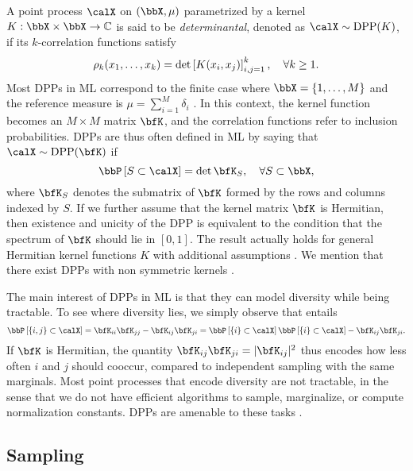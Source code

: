 \documentclass[twoside,11pt]{article}
\begin{document}
    A point process $\calX$ on $(\bbX,\mu)$ parametrized by a kernel $K:\bbX\times \bbX\rightarrow \mathbb{C}$ is said to be \emph{determinantal}, denoted as $\calX\sim\DPP(K)$, if its $k$-correlation functions satisfy
	  \begin{equation*}
	  \label{eq:k-correlation_function_DPP}
	    \rho_k(x_1,\dots,x_k)
	      = \det \left[ K(x_i, x_j) \right]_{i,j=1}^k,
	    \quad \forall k\geq 1.
	  \end{equation*}
		Most DPPs in ML correspond to the finite case where $\bbX = \lrcb{1,\dots,M}$ and the reference measure is $\mu=\sum_{i=1}^M \delta_i$ \citep{KuTa12}.
		In this context, the kernel function becomes an $M\times M$ matrix $\bfK$, and the correlation functions refer to inclusion probabilities. DPPs are thus often defined in ML by saying that $\calX\sim \DPP(\bfK)$ if
	  \begin{equation}
	  \label{eq:inclusion_proba_finite}
	    \Proba{S \subset \calX} = \det {\bfK}_S,
	      \quad\forall S\subset \bbX,
	  \end{equation}
    where ${\bfK}_S$ denotes the submatrix of $\bfK$ formed by the rows and columns indexed by $S$. If we further assume that the kernel matrix $\bfK$ is Hermitian, then existence and unicity of the DPP  is equivalent to the condition that the spectrum of $\bfK$ should lie in $[0,1]$.
    The result actually holds for general Hermitian kernel functions $K$ with additional assumptions \cite[Theorem 3]{Sos00}.
    We mention that there exist DPPs with non symmetric kernels \citep{BoDiFu10}.

    The main interest of DPPs in ML is that they can model diversity while being tractable.
    To see where diversity lies, we simply observe that  entails
    $$ \Proba{\{i,j\} \subset \calX} = {\bfK}_{ii}{\bfK}_{jj}-{\bfK}_{ij}{\bfK}_{ji} = \Proba{\{i\} \subset \calX}\Proba{\{i\} \subset \calX} - {\bfK}_{ij}{\bfK}_{ji}.$$
    If $\bfK$ is Hermitian, the quantity ${\bfK}_{ij}{\bfK}_{ji} = \vert{\bfK}_{ij}\vert^2$ thus encodes how less often $i$ and $j$ should cooccur, compared to independent sampling with the same marginals.
    Most point processes that encode diversity are not tractable, in the sense that we do not have efficient algorithms to sample, marginalize, or compute normalization constants.
    DPPs are amenable to these tasks \citep{KuTa12}.

  \subsection{Sampling} %
  \label{sub:sampling}
\end{document}
